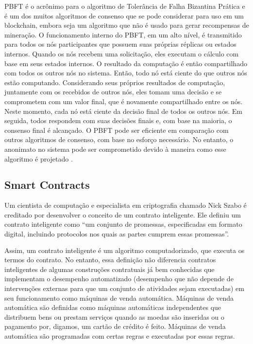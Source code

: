             PBFT é o acrônimo para o algoritmo de Tolerância de Falha Bizantina Prática e é um dos muitos algoritmos de consenso que se pode considerar para uso em um blockchain, embora seja um algoritmo que não é usado para gerar recompensas de mineração. O funcionamento interno do PBFT, em um alto nível, é transmitido para todos os nós participantes que possuem suas próprias réplicas ou estados internos. Quando os nós recebem uma solicitação, eles executam o cálculo com base em seus estados internos. O resultado da computação é então compartilhado com todos os outros nós no sistema. Então, todo nó está ciente do que outros nós estão computando. Considerando seus próprios resultados de computação, juntamente com os recebidos de outros nós, eles tomam uma decisão e se comprometem com um valor final, que é novamente compartilhado entre os nós. Neste momento, cada nó está ciente da decisão final de todos os outros nós. Em seguida, todos respondem com suas decisões finais e, com base na maioria, o consenso final é alcançado. O PBFT pode ser eficiente em comparação com outros algoritmos de consenso, com base no esforço necessário. No entanto, o anonimato no sistema pode ser comprometido devido à maneira como esse algoritmo é projetado \cite{beginnig_blockchain_bikramaditya}.

    
    \subsection{Smart Contracts}
        
        Um cientista de computação e especialista em criptografia chamado Nick Szabo é creditado por desenvolver o conceito de um contrato inteligente. Ele definiu um contrato inteligente como ``um conjunto de promessas, especificadas em formato digital, incluindo protocolos nos quais as partes cumprem essas promessas''. \cite{smart_contracts_szabo}

        Assim, um contrato inteligente é um algoritmo computadorizado, que executa os termos do contrato. No entanto, essa definição não diferencia contratos inteligentes de algumas construções contratuais já bem conhecidas que implementam o desempenho automatizado (desempenho que não depende de intervenções externas para que um conjunto de atividades sejam executadas) em seu funcionamento como máquinas de venda automática. Máquinas de venda automática são definidas como máquinas automáticas independentes que distribuem bens ou prestam serviços quando as moedas são inseridas ou o pagamento por, digamos, um cartão de crédito é feito. Máquinas de venda automática são programadas com certas regras e executadas por essas regras. \cite{blockchain_pratical_guide}
        

